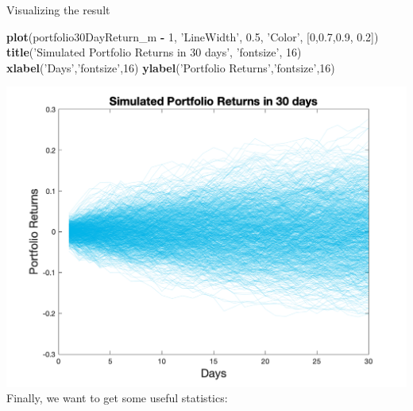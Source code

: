 \documentclass[]{book}
\newenvironment{Shaded}{\begin{snugshade}}{\end{snugshade}}
\newcommand{\DecValTok}[1]{\textcolor[rgb]{0.00,0.00,0.81}{#1}}
\newcommand{\FloatTok}[1]{\textcolor[rgb]{0.00,0.00,0.81}{#1}}
\newcommand{\KeywordTok}[1]{\textcolor[rgb]{0.13,0.29,0.53}{\textbf{#1}}}
\newcommand{\NormalTok}[1]{#1}
\newcommand{\OperatorTok}[1]{\textcolor[rgb]{0.81,0.36,0.00}{\textbf{#1}}}
\newcommand{\StringTok}[1]{\textcolor[rgb]{0.31,0.60,0.02}{#1}}
\begin{document}
Visualizing the result

\begin{Shaded}
\begin{Highlighting}[]
\KeywordTok{plot}\NormalTok{(portfolio30DayReturn_m }\OperatorTok{-}\StringTok{ }\DecValTok{1}\NormalTok{, }\StringTok{'LineWidth'}\NormalTok{, }\FloatTok{0.5}\NormalTok{, }\StringTok{'Color'}\NormalTok{, [}\DecValTok{0}\NormalTok{,}\FloatTok{0.7}\NormalTok{,}\FloatTok{0.9}\NormalTok{, }\FloatTok{0.2}\NormalTok{])}
\KeywordTok{title}\NormalTok{(}\StringTok{'Simulated Portfolio Returns in 30 days'}\NormalTok{, }\StringTok{'fontsize'}\NormalTok{, }\DecValTok{16}\NormalTok{)}
\KeywordTok{xlabel}\NormalTok{(}\StringTok{'Days'}\NormalTok{,}\StringTok{'fontsize'}\NormalTok{,}\DecValTok{16}\NormalTok{)}
\KeywordTok{ylabel}\NormalTok{(}\StringTok{'Portfolio Returns'}\NormalTok{,}\StringTok{'fontsize'}\NormalTok{,}\DecValTok{16}\NormalTok{)}
\end{Highlighting}
\end{Shaded}

\includegraphics{./Stats506/matlab_pics/ThirtyDay_Returns_Matlab_MC.png}
Finally, we want to get some useful statistics:
\end{document}
